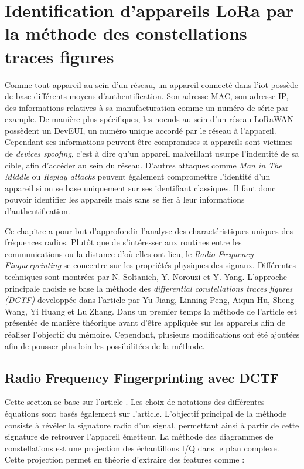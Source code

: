 \chapter{Identification d'appareils LoRa par la méthode des constellations traces figures}

Comme tout appareil au sein d'un réseau, un appareil connecté dans l'iot possède de base différents moyens d'authentification. Son adresse MAC, son adresse IP, des informations relatives à sa manufacturation comme un numéro de série par example. De manière plus spécifiques, les noeuds au sein d'un réseau LoRaWAN possèdent un DevEUI, un numéro unique accordé par le réseau à l'appareil. Cependant ses informations peuvent être compromises si appareils sont victimes de \textit{devices spoofing}, c'est à dire qu'un appareil malveillant usurpe l'indentité de sa cible, afin d'accéder au sein du réseau. D'autres attaques comme \textit{Man in The Middle} ou \textit{Replay attacks} peuvent également compromettre l'identité d'un appareil si on se base uniquement sur ses identifiant classiques\cite{attack}. Il faut donc pouvoir identifier les appareils mais sans se fier à leur informations d'authentification.

\vspace{0.1cm}

Ce chapitre a pour but d'approfondir l'analyse des charactéristiques uniques des fréquences radios. Plutôt que de s'intéresser aux routines entre les communications ou la distance d'où elles ont lieu, le \textit{Radio Frequency Finguerprinting} se concentre sur les propriétés physiques des signaux. Différentes techniques sont montrées par N. Soltanieh, Y. Norouzi et Y. Yang\cite{rffi1}. L'approche principale choisie se base la méthode des \textit{differential constellations traces figures (DCTF)} developpée dans l'article \cite{loraDCTF} par Yu Jiang, Linning Peng, Aiqun Hu, Sheng Wang, Yi Huang et Lu Zhang. Dans un premier temps la méthode de l'article est présentée de manière théorique avant d'être appliquée sur les appareils afin de réaliser l'objectif du mémoire. Cependant, plusieurs modifications ont été ajoutées afin de pousser plus loin les possibilitées de la méthode.

\section{Radio Frequency Fingerprinting avec DCTF}\label{DCTF}

Cette section se base sur l'article \cite{loraDCTF}. Les choix de notations des différentes équations sont basés également sur l'article. L'objectif principal de la méthode consiste à révéler la signature radio d'un signal, permettant ainsi à partir de cette signature de retrouver l'appareil émetteur. La méthode des diagrammes de constellations est une projection des échantillons I/Q dans le plan complexe. Cette projection permet en théorie d'extraire des features comme :

